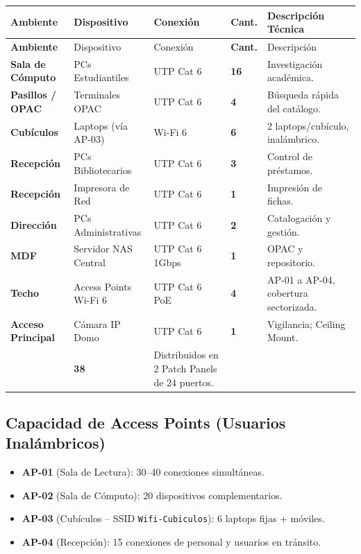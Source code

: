 \documentclass[12pt,a4paper]{article}
\begin{document}
\begin{longtable}{>{\bfseries\small}p{2.8cm}>{\small}p{3.2cm}>{\small}p{2.2cm}>{\centering\small\bfseries}p{1.2cm}>{\small}p{3.6cm}}
  \toprule
  \rowcolor{colorPrincipal}
  \color{white}Ambiente&\color{white}Dispositivo&\color{white}Conexión&\color{white}Cant.&\color{white}Descripción Técnica\\
  \midrule\endfirsthead
  \toprule
  \rowcolor{colorPrincipal}
  \color{white}Ambiente&\color{white}Dispositivo&\color{white}Conexión&\color{white}Cant.&\color{white}Descripción\\
  \midrule\endhead
  \bottomrule\endlastfoot
  Sala de Cómputo & PCs Estudiantiles      & UTP Cat 6      & 16 & Investigación académica. \\
  Pasillos / OPAC & Terminales OPAC        & UTP Cat 6      & 4  & Búsqueda rápida del catálogo. \\
  Cubículos       & Laptops (vía AP-03)    & Wi-Fi 6        & 6  & 2 laptops/cubículo, inalámbrico. \\
  Recepción       & PCs Bibliotecarios     & UTP Cat 6      & 3  & Control de préstamos. \\
  Recepción       & Impresora de Red       & UTP Cat 6      & 1  & Impresión de fichas. \\
  Dirección       & PCs Administrativas    & UTP Cat 6      & 2  & Catalogación y gestión. \\
  MDF             & Servidor NAS Central   & UTP Cat 6 1Gbps& 1  & OPAC y repositorio. \\
  Techo           & Access Points Wi-Fi 6  & UTP Cat 6 PoE  & 4  & AP-01 a AP-04, cobertura sectorizada. \\
  Acceso Principal& Cámara IP Domo         & UTP Cat 6      & 1  & Vigilancia; Ceiling Mount. \\
  \midrule
  \multicolumn{3}{r}{\bfseries TOTAL PUNTOS CABLEADOS}&
  \bfseries\color{colorPrincipal}38&Distribuidos en 2 Patch Panels de 24 puertos.\\
\end{longtable}

\subsection{Capacidad de Access Points (Usuarios Inalámbricos)}
\begin{itemize}[leftmargin=1.5em,itemsep=2pt]
  \item \textbf{AP-01} (Sala de Lectura): 30--40 conexiones simultáneas.
  \item \textbf{AP-02} (Sala de Cómputo): 20 dispositivos complementarios.
  \item \textbf{AP-03} (Cubículos -- SSID \texttt{Wifi-Cubiculos}): 6 laptops fijas + móviles.
  \item \textbf{AP-04} (Recepción): 15 conexiones de personal y usuarios en tránsito.
\end{itemize}
\end{document}
